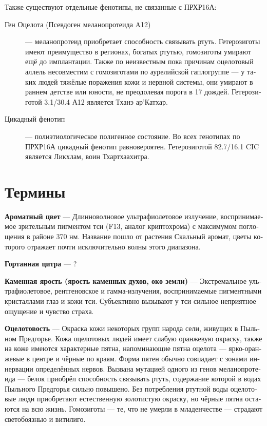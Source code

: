 \documentclass[a4paper,12pt,fleqn]{book}\usepackage{polyglossia}\setdefaultlanguage[babelshorthands=true]{russian}\setotherlanguage{english}\defaultfontfeatures{Ligatures=TeX,Mapping=tex-text}\usepackage{xcolor}\newcommand{\ml}[3]{#2}
\newcommand{\theterm}[3]{\textbf{\hypertarget{#1}{#2}} --- #3}
\begin{document}
Также существуют отдельные фенотипы, не связанные с ПРХР16А:

\begin{description}
\item[Ген Оцелота (Псевдоген меланопротеида A12)] --- меланопротеид приобретает способность связывать ртуть.
Гетерозиготы имеют преимущество в регионах, богатых ртутью, гомозиготы умирают ещё до имплантации.
Также по неизвестным пока причинам оцелотовый аллель несовместим с гомозиготами по аурелийской гаплогруппе --- у таких людей тяжёлые поражения кожи и нервной системы, они умирают в раннем детстве или юности, не преодолевая порога в 17 дождей.
Гетерозиготой 3.1/30.4 А12 является Тханэ ар'Катхар.
\item[Цикадный фенотип] --- полиэтиологическое полигенное состояние.
Во всех генотипах по ПРХР16А цикадный фенотип равновероятен.
Гетерозиготой 82.7/16.1 CIC является Ликхлам, воин Тхартхаахитра.
\end{description}


\section{Термины}

\theterm{flavor-color}
{Ароматный цвет}
{Длинноволновое ультрафиолетовое излучение, воспринимаемое зрительным пигментом тси (F13, аналог криптохрома) с максимумом поглощения в районе 370 нм.
Название пошло от растения Скальный аромат, цветы которого отражает почти исключительно волны этого диапазона.}

\theterm{throat-cither}
{Гортанная цитра}
{?}

\theterm{stone-fury}
{Каменная ярость (ярость каменных духов, око земли)}
{Экстремальное ультрафиолетовое, рентгеновское и гамма-излучения, воспринимаемые пигментными кристаллами глаз и кожи тси.
Субъективно вызывают у тси сильное неприятное ощущение и чувство страха.}

\theterm{ocelocity}
{Оцелотовость}
{Окраска кожи некоторых групп народа сели, живущих в Пыльном Предгорье.
Кожа оцелотовых людей имеет слабую оранжевую окраску, также на коже имеются характерные пятна, напоминающие пятна оцелота --- ярко-оранжевые в центре и чёрные по краям.
Форма пятен обычно совпадает с зонами иннервации определённых нервов.
Вызвана мутацией одного из генов меланопротеида --- белок приобрёл способность связывать ртуть, содержание которой в водах Пыльного Предгорья сильно повышено.
Без потребления ртутной воды оцелотовые люди приобретают естественную золотистую окраску, но чёрные пятна остаются на всю жизнь.
Гомозиготы --- те, что не умерли в младенчестве --- страдают светобоязнью и витилиго.}
\end{document}
